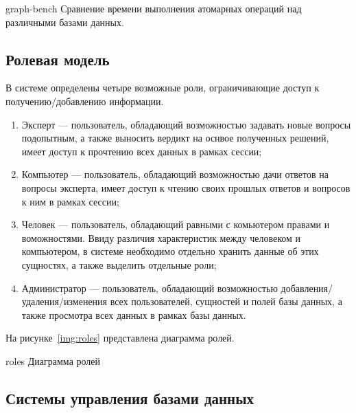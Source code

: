 \clearpage

\img{100mm}
{graph-bench}
{Сравнение времени выполнения атомарных операций над различными базами данных.}

\subsection{Ролевая модель}
В системе определены четыре возможные роли, ограничивающие доступ к получению/добавлению информации.
\begin{enumerate}
  \item Эксперт --- пользователь, обладающий возможностью задавать новые вопросы подопытным, а также выносить вердикт на оснвое полученных решений, имеет доступ к прочтению всех данных в рамках сессии;
  \item Компьютер --- пользователь, обладающий возможностью дачи ответов на вопросы эксперта, имеет доступ к чтению своих прошлых ответов и вопросов к ним в рамках сессии;
  \item Человек --- пользователь, обладающий равными с комьютером правами и воможностями. Ввиду различия характеристик между человеком и компьютером, в системе необходимо отдельно хранить данные об этих сущностях, а также выделить отдельные роли;
  \item Администратор --- пользователь, обладающий возможностью добавления/удаления/изменения всех пользователей, сущностей и полей базы данных, а также просмотра всех данных в рамках базы данных.
\end{enumerate}

На рисунке~\ref{img:roles} представлена диаграмма ролей.

\img{160mm}
{roles}
{Диаграмма ролей}


\subsection{Системы управления базами данных}

%
%


